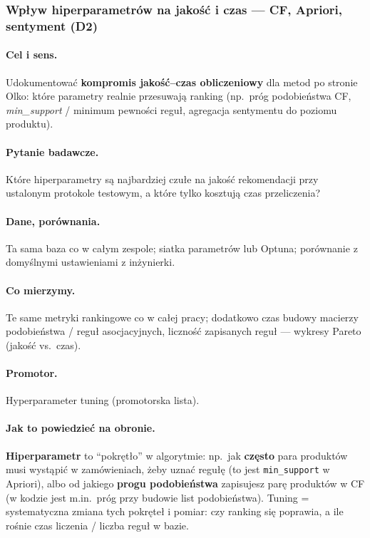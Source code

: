 \documentclass[a4paper,11pt]{article}
\newcommand{\code}[1]{\texttt{\small #1}}
\begin{document}
\subsubsection{Wpływ hiperparametrów na jakość i czas --- CF, Apriori, sentyment (\textbf{D2})}

\paragraph{Cel i sens.}
Udokumentować \textbf{kompromis jakość--czas obliczeniowy} dla metod po stronie Olko: które parametry realnie przesuwają ranking (np.\ próg podobieństwa CF, \emph{min\_support} / minimum pewności reguł, agregacja sentymentu do poziomu produktu).

\paragraph{Pytanie badawcze.}
Które hiperparametry są najbardziej czułe na jakość rekomendacji przy ustalonym protokole testowym, a które tylko kosztują czas przeliczenia?

\paragraph{Dane, porównania.}
Ta sama baza co w całym zespole; siatka parametrów lub Optuna; porównanie z domyślnymi ustawieniami z inżynierki.

\paragraph{Co mierzymy.}
Te same metryki rankingowe co w całej pracy; dodatkowo czas budowy macierzy podobieństwa / reguł asocjacyjnych, liczność zapisanych reguł --- wykresy Pareto (jakość vs.\ czas).

\paragraph{Promotor.}
Hyperparameter tuning (promotorska lista).

\paragraph{Jak to powiedzieć na obronie.}
\textbf{Hiperparametr} to ``pokrętło'' w algorytmie: np.\ jak \textbf{często} para produktów musi wystąpić w zamówieniach, żeby uznać regułę (to jest \code{min\_support} w Apriori), albo od jakiego \textbf{progu podobieństwa} zapisujesz parę produktów w CF (w kodzie jest m.in.\ próg przy budowie list podobieństwa). Tuning = systematyczna zmiana tych pokręteł i pomiar: czy ranking się poprawia, a ile rośnie czas liczenia / liczba reguł w bazie.
\end{document}
